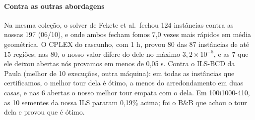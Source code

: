 \documentclass[11pt,a4paper]{article}
\theoremstyle{plain}\newtheorem{proposicao}{Proposição}
\theoremstyle{definition}\newtheorem{definicao}{Definição}
\theoremstyle{plain}\newtheorem{teorema}{Teorema}
\theoremstyle{plain}\newtheorem{lema}{Lema}
\begin{document}
\paragraph{Contra as outras abordagens} Na mesma coleção, o solver de Fekete et al.\ fechou 124 instâncias contra as nossas 197 (06/10), e onde ambos fecham fomos 7,0 vezes mais rápidos em média geométrica. O CPLEX do rascunho, com 1 h, provou 80 das 87 instâncias de até 15 regiões; nas 80, o nosso valor difere do dele no máximo \(3{,}2\times10^{-5}\), e as 7 que ele deixou abertas nós provamos em menos de 0,05 s. Contra o ILS-BCD da Paula (melhor de 10 execuções, outra máquina): em todas as instâncias que certificamos, o melhor tour dela é ótimo, a menos do arredondamento em duas casas, e nas 6 abertas o nosso melhor tour empata com o dela. Em 100i1000-410, as 10 sementes da nossa ILS pararam 0,19\% acima; foi o B\&B que achou o tour dela e provou que é ótimo.

\end{document}
